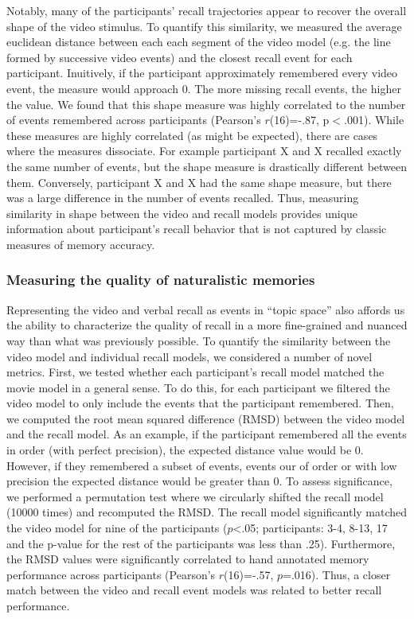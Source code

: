 \documentclass{article}
\begin{document}
{Notably, many of the participants' recall trajectories appear to recover the overall shape of the video stimulus. To quantify this similarity, we measured the average euclidean distance between each each segment of the video model (e.g. the line formed by successive video events) and the closest recall event for each participant.  Inuitively, if the participant approximately remembered every video event, the measure would approach 0. The more missing recall events, the higher the value. We found that this shape measure was highly correlated to the number of events remembered across participants (Pearson's $r$(16)=-.87, p$<$.001). While these measures are highly correlated (as might be expected), there are cases where the measures dissociate.  For example participant X and X recalled exactly the same number of events, but the shape measure is drastically different between them.  Conversely, participant X and X had the same shape measure, but there was a large difference in the number of events recalled. Thus, measuring similarity in shape between the video and recall models provides unique information about participant's recall behavior that is not captured by classic measures of memory accuracy.

\subsubsection{Measuring the quality of naturalistic memories}
Representing the video and verbal recall as events in ``topic space'' also affords us the ability to characterize the quality of recall in a more fine-grained and nuanced way than what was previously possible. To quantify the similarity between the video model and individual recall models, we considered a number of novel metrics.  First, we tested whether each participant's recall model matched the movie model in a general sense. To do this, for each participant we filtered the video model to only include the events that the participant remembered. Then, we computed the root mean squared difference (RMSD) between the video model and the recall model. As an example, if the participant remembered all the events in order (with perfect precision), the expected distance value would be 0. However, if they remembered a subset of events, events our of order or with low precision the expected distance would be greater than 0. To assess significance, we performed a permutation test where we circularly shifted the recall model (10000 times) and recomputed the RMSD. The recall model significantly matched the video model for nine of the participants ($p$<.05; participants: 3-4, 8-13, 17 and the p-value for the rest of the participants was less than .25). Furthermore, the RMSD values were significantly correlated to hand annotated memory performance across participants (Pearson's $r$(16)=-.57, $p$=.016). Thus, a closer match between the video and recall event models was related to better recall performance.

}
\end{document}
